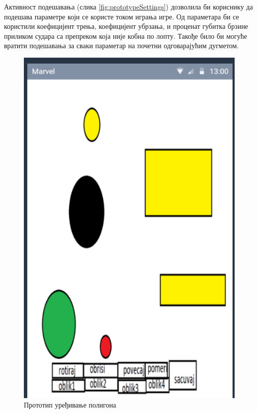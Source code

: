 Активност подешавања (слика \ref{fig:prototypeSettings}) дозволила би кориснику да подешава параметре који се користе током играња игре. Од параметара би се користили коефицијент трења, коефицијент убрзања,  и проценат губитка брзине приликом судара са препреком која није кобна по лопту. Такође било би могуће вратити подешавања за сваки параметар на почетни одговарајућим дугметом.

\begin{figure}[htb!]
\begin{center}
\includegraphics[scale=.5]{pictures/prototype/createPolygonActivity}
\caption{Прототип уређивање полигона}\label{fig:createPolygonActivity}
\end{center}
\end{figure}

